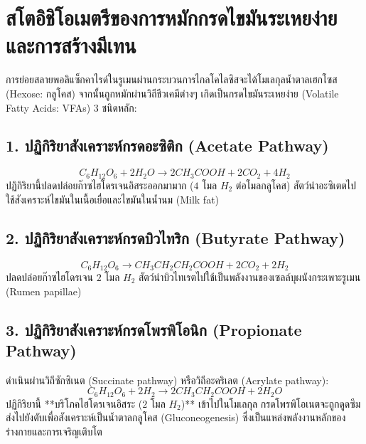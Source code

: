 \section{สโตอิชิโอเมตรีของการหมักกรดไขมันระเหยง่ายและการสร้างมีเทน}

การย่อยสลายพอลิแซ็กคาไรด์ในรูเมนผ่านกระบวนการไกลโคไลซิสจะได้โมเลกุลน้ำตาลเฮกโซส (Hexose: กลูโคส) จากนั้นถูกหมักผ่านวิถีชีวเคมีต่างๆ เกิดเป็นกรดไขมันระเหยง่าย (Volatile Fatty Acids: VFAs) 3 ชนิดหลัก:

\subsection{1. ปฏิกิริยาสังเคราะห์กรดอะซิติก (Acetate Pathway)}
\begin{equation}
C_6H_{12}O_6 + 2 H_2O \longrightarrow 2 CH_3COOH + 2 CO_2 + 4 H_2
\end{equation}
ปฏิกิริยานี้ปลดปล่อยก๊าซไฮโดรเจนอิสระออกมามาก ($4\text{ โมล } H_2\text{ ต่อโมลกลูโคส}$) สัตว์นำอะซิเตตไปใช้สังเคราะห์ไขมันในเนื้อเยื่อและไขมันในน้ำนม (Milk fat)

\subsection{2. ปฏิกิริยาสังเคราะห์กรดบิวไทริก (Butyrate Pathway)}
\begin{equation}
C_6H_{12}O_6 \longrightarrow CH_3CH_2CH_2COOH + 2 CO_2 + 2 H_2
\end{equation}
ปลดปล่อยก๊าซไฮโดรเจน $2\text{ โมล } H_2$ สัตว์นำบิวไทเรตไปใช้เป็นพลังงานของเซลล์บุผนังกระเพาะรูเมน (Rumen papillae)

\subsection{3. ปฏิกิริยาสังเคราะห์กรดโพรพิโอนิก (Propionate Pathway)}
ดำเนินผ่านวิถีซักซิเนต (Succinate pathway) หรือวิถีอะคริเลต (Acrylate pathway):
\begin{equation}
C_6H_{12}O_6 + 2 H_2 \longrightarrow 2 CH_3CH_2COOH + 2 H_2O
\end{equation}
ปฏิกิริยานี้ **บริโภคไฮโดรเจนอิสระ ($2\text{ โมล } H_2$)** เข้าไปในโมเลกุล กรดโพรพิโอเนตจะถูกดูดซึมส่งไปยังตับเพื่อสังเคราะห์เป็นน้ำตาลกลูโคส (Gluconeogenesis) ซึ่งเป็นแหล่งพลังงานหลักของร่างกายและการเจริญเติบโต

